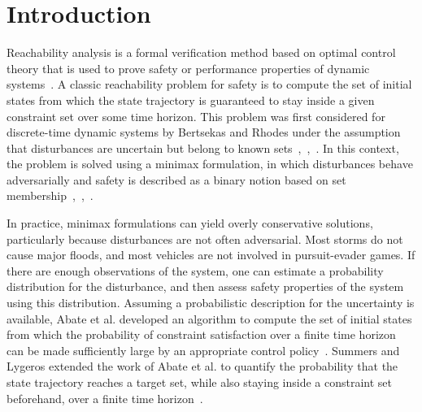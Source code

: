 \documentclass[letterpaper, 10 pt, conference]{ieeeconf}  %
\begin{document}
\section{Introduction}
Reachability analysis is a formal verification method based on optimal control theory that is used to prove 
safety or performance properties of dynamic systems~\cite{bansal2017hamilton}.
A classic reachability problem for safety is to compute the set of initial states from which 
the state trajectory is guaranteed to stay inside a given constraint set over some time horizon.
This problem was first considered for discrete-time dynamic systems by Bertsekas and Rhodes 
under the assumption that disturbances are uncertain but belong to known sets~\cite{bertsekas1971control},~\cite{bertsekas1971minimax},~\cite{bertsekas2005dynamic}.
In this context, the problem is solved using a minimax formulation,
in which disturbances behave adversarially and safety is described as a binary notion based on set membership~\cite{bertsekas1971control},~\cite{bertsekas1971minimax},~\cite{bertsekas2005dynamic}.\footnotemark 
{}

In practice, minimax formulations can yield overly conservative solutions, particularly because disturbances are not often adversarial.
Most storms do not cause major floods, and most vehicles are not involved in pursuit-evader games.
If there are enough observations of the system, one can estimate a probability distribution
for the disturbance, and then assess safety properties of the system using this distribution.\footnotemark
{} 
Assuming a probabilistic description for the uncertainty is available, 
Abate et al. developed an algorithm to compute the set of initial states
from which the probability of constraint satisfaction over a finite time horizon
can be made sufficiently large by an appropriate control policy~\cite{abate2008probabilistic}. 
Summers and Lygeros extended the work of Abate et al. to quantify the probability that the state trajectory 
reaches a target set, while also staying inside a constraint set beforehand, over a finite time horizon~\cite{summers2010verification}. 
\end{document}

